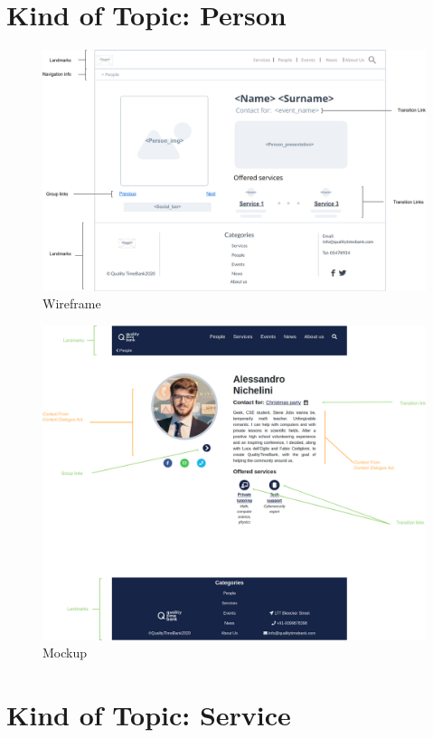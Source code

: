 \documentclass[a4paper, 11pt, parskip=half, headsepline]{scrreprt}
\begin{document}
\section{Kind of Topic: Person}

\begin{figure}[H]
    \centering
    \includegraphics[width=1\linewidth, keepaspectratio]{wireframes/KindOfTopic-Person}
    \caption{Wireframe}
\end{figure}

\begin{figure}[H]
    \centering
    \includegraphics[width=1\linewidth, keepaspectratio]{mockups/ConcretePerson}
    \caption{Mockup}
\end{figure}

\section{Kind of Topic: Service}
\end{document}
